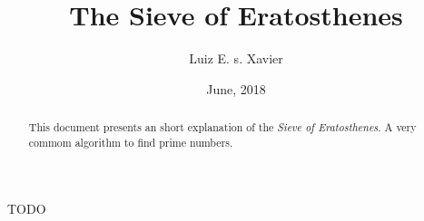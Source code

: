 \documentclass{article}
\title{The Sieve of Eratosthenes}
\author{Luiz E. s. Xavier}
\date{June, 2018}
\begin{document}
    \begin{abstract}
        This document presents an short explanation of the \textit{Sieve of Eratosthenes}. A very commom algorithm to find prime numbers.
    \end{abstract}

    TODO
\end{document}
